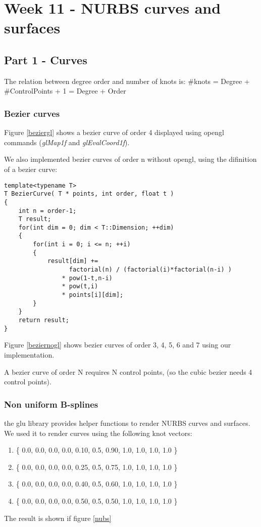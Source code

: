 \chapter{Week 11 - NURBS curves and surfaces}

\section{Part 1 - Curves}

The relation between degree order and number of knots is:
#knots = Degree + #ControlPoints + 1 = Degree + Order

\subsection{Bezier curves}

Figure \ref{beziergl} shows a bezier curve of order 4 displayed using opengl
commands (\textit{glMap1f} and \textit{glEvalCoord1f}).

We also implemented bezier curves of order n without opengl, using the difinition
of a bezier curve:
\begin{lstlisting}[caption=Generic bezier curve]
template<typename T>
T BezierCurve( T * points, int order, float t )
{
    int n = order-1;
    T result;
    for(int dim = 0; dim < T::Dimension; ++dim)
    {
        for(int i = 0; i <= n; ++i)
        {
            result[dim] += 
                  factorial(n) / (factorial(i)*factorial(n-i) )
                * pow(1-t,n-i)
                * pow(t,i)
                * points[i][dim];
        }
    }
    return result;
} 
\end{lstlisting}

Figure \ref{beziernogl} shows bezier curves of order 3, 4, 5, 6 and 7 using our implementation.

A bezier curve of order N requires N control points, (so the cubic bezier needs 4 control points). 


\subsection{Non uniform B-splines}

the glu library provides helper functions to render NURBS curves and surfaces. We
used it to render curves using the following knot vectors:
\begin{enumerate}
    \item \{ 0.0, 0.0, 0.0, 0.0, 0.10, 0.5, 0.90, 1.0, 1.0, 1.0, 1.0 \} 
    \item \{ 0.0, 0.0, 0.0, 0.0, 0.25, 0.5, 0.75, 1.0, 1.0, 1.0, 1.0 \} 
    \item \{ 0.0, 0.0, 0.0, 0.0, 0.40, 0.5, 0.60, 1.0, 1.0, 1.0, 1.0 \}
    \item \{ 0.0, 0.0, 0.0, 0.0, 0.50, 0.5, 0.50, 1.0, 1.0, 1.0, 1.0 \}
\end{enumerate}
The result is shown if figure \ref{nubs}

